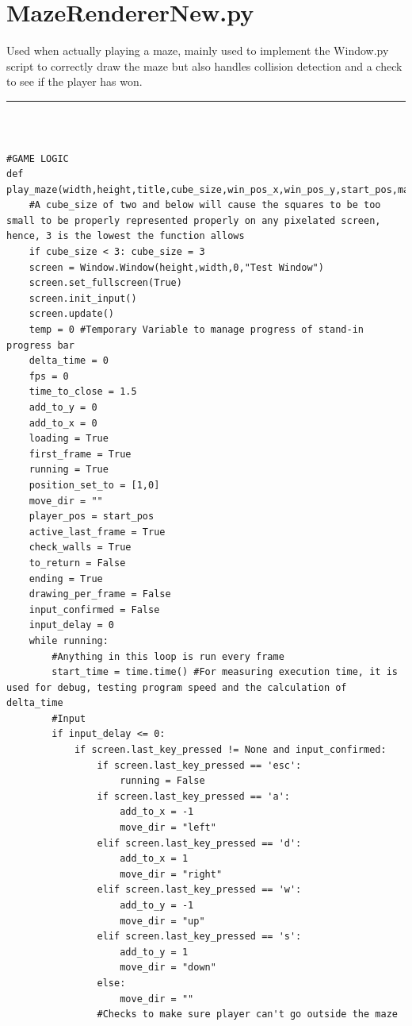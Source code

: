 \documentclass{article}
\begin{document}
\section{MazeRendererNew.py}
Used when actually playing a maze, mainly used to implement the Window.py script to correctly draw the maze but also handles collision detection and a check to see if the player has won.

\textcolor[RGB]{220,220,220}{\rule{\linewidth}{0.2pt}}
\\
\begin{lstlisting}
\end{lstlisting}
\begin{lstlisting}
#GAME LOGIC
def play_maze(width,height,title,cube_size,win_pos_x,win_pos_y,start_pos,maze_data):
    #A cube_size of two and below will cause the squares to be too small to be properly represented properly on any pixelated screen, hence, 3 is the lowest the function allows
    if cube_size < 3: cube_size = 3 
    screen = Window.Window(height,width,0,"Test Window")
    screen.set_fullscreen(True)
    screen.init_input()
    screen.update()
    temp = 0 #Temporary Variable to manage progress of stand-in progress bar
    delta_time = 0
    fps = 0
    time_to_close = 1.5
    add_to_y = 0
    add_to_x = 0
    loading = True
    first_frame = True
    running = True
    position_set_to = [1,0]
    move_dir = ""
    player_pos = start_pos
    active_last_frame = True
    check_walls = True
    to_return = False
    ending = True
    drawing_per_frame = False
    input_confirmed = False
    input_delay = 0    
    while running:
        #Anything in this loop is run every frame
        start_time = time.time() #For measuring execution time, it is used for debug, testing program speed and the calculation of delta_time        
        #Input
        if input_delay <= 0:
            if screen.last_key_pressed != None and input_confirmed:
                if screen.last_key_pressed == 'esc':
                    running = False
                if screen.last_key_pressed == 'a':
                    add_to_x = -1
                    move_dir = "left"
                elif screen.last_key_pressed == 'd':
                    add_to_x = 1
                    move_dir = "right"
                elif screen.last_key_pressed == 'w':
                    add_to_y = -1
                    move_dir = "up"
                elif screen.last_key_pressed == 's':
                    add_to_y = 1
                    move_dir = "down"
                else:
                    move_dir = ""
                #Checks to make sure player can't go outside the maze

\end{lstlisting}
\end{document}
